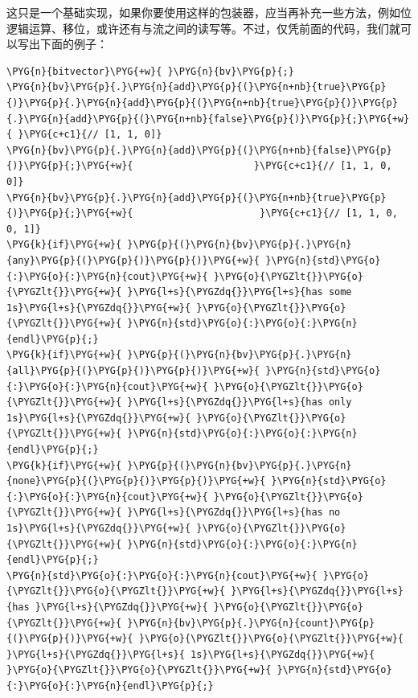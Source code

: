 
这只是一个基础实现，如果你要使用这样的包装器，应当再补充一些方法，例如位逻辑运算、移位，或许还有与流之间的读写等。不过，仅凭前面的代码，我们就可以写出下面的例子：



\begin{codeblockbg}
\begin{Verbatim}[commandchars=\\\{\},breaklines=true,breakanywhere=true,fontsize=\codefont,xleftmargin=17bp]
\PYG{n}{bitvector}\PYG{+w}{ }\PYG{n}{bv}\PYG{p}{;}
\PYG{n}{bv}\PYG{p}{.}\PYG{n}{add}\PYG{p}{(}\PYG{n+nb}{true}\PYG{p}{)}\PYG{p}{.}\PYG{n}{add}\PYG{p}{(}\PYG{n+nb}{true}\PYG{p}{)}\PYG{p}{.}\PYG{n}{add}\PYG{p}{(}\PYG{n+nb}{false}\PYG{p}{)}\PYG{p}{;}\PYG{+w}{ }\PYG{c+c1}{// [1, 1, 0]}
\PYG{n}{bv}\PYG{p}{.}\PYG{n}{add}\PYG{p}{(}\PYG{n+nb}{false}\PYG{p}{)}\PYG{p}{;}\PYG{+w}{                     }\PYG{c+c1}{// [1, 1, 0, 0]}
\PYG{n}{bv}\PYG{p}{.}\PYG{n}{add}\PYG{p}{(}\PYG{n+nb}{true}\PYG{p}{)}\PYG{p}{;}\PYG{+w}{                      }\PYG{c+c1}{// [1, 1, 0, 0, 1]}
\PYG{k}{if}\PYG{+w}{ }\PYG{p}{(}\PYG{n}{bv}\PYG{p}{.}\PYG{n}{any}\PYG{p}{(}\PYG{p}{)}\PYG{p}{)}\PYG{+w}{ }\PYG{n}{std}\PYG{o}{:}\PYG{o}{:}\PYG{n}{cout}\PYG{+w}{ }\PYG{o}{\PYGZlt{}}\PYG{o}{\PYGZlt{}}\PYG{+w}{ }\PYG{l+s}{\PYGZdq{}}\PYG{l+s}{has some 1s}\PYG{l+s}{\PYGZdq{}}\PYG{+w}{ }\PYG{o}{\PYGZlt{}}\PYG{o}{\PYGZlt{}}\PYG{+w}{ }\PYG{n}{std}\PYG{o}{:}\PYG{o}{:}\PYG{n}{endl}\PYG{p}{;}
\PYG{k}{if}\PYG{+w}{ }\PYG{p}{(}\PYG{n}{bv}\PYG{p}{.}\PYG{n}{all}\PYG{p}{(}\PYG{p}{)}\PYG{p}{)}\PYG{+w}{ }\PYG{n}{std}\PYG{o}{:}\PYG{o}{:}\PYG{n}{cout}\PYG{+w}{ }\PYG{o}{\PYGZlt{}}\PYG{o}{\PYGZlt{}}\PYG{+w}{ }\PYG{l+s}{\PYGZdq{}}\PYG{l+s}{has only 1s}\PYG{l+s}{\PYGZdq{}}\PYG{+w}{ }\PYG{o}{\PYGZlt{}}\PYG{o}{\PYGZlt{}}\PYG{+w}{ }\PYG{n}{std}\PYG{o}{:}\PYG{o}{:}\PYG{n}{endl}\PYG{p}{;}
\PYG{k}{if}\PYG{+w}{ }\PYG{p}{(}\PYG{n}{bv}\PYG{p}{.}\PYG{n}{none}\PYG{p}{(}\PYG{p}{)}\PYG{p}{)}\PYG{+w}{ }\PYG{n}{std}\PYG{o}{:}\PYG{o}{:}\PYG{n}{cout}\PYG{+w}{ }\PYG{o}{\PYGZlt{}}\PYG{o}{\PYGZlt{}}\PYG{+w}{ }\PYG{l+s}{\PYGZdq{}}\PYG{l+s}{has no 1s}\PYG{l+s}{\PYGZdq{}}\PYG{+w}{ }\PYG{o}{\PYGZlt{}}\PYG{o}{\PYGZlt{}}\PYG{+w}{ }\PYG{n}{std}\PYG{o}{:}\PYG{o}{:}\PYG{n}{endl}\PYG{p}{;}
\PYG{n}{std}\PYG{o}{:}\PYG{o}{:}\PYG{n}{cout}\PYG{+w}{ }\PYG{o}{\PYGZlt{}}\PYG{o}{\PYGZlt{}}\PYG{+w}{ }\PYG{l+s}{\PYGZdq{}}\PYG{l+s}{has }\PYG{l+s}{\PYGZdq{}}\PYG{+w}{ }\PYG{o}{\PYGZlt{}}\PYG{o}{\PYGZlt{}}\PYG{+w}{ }\PYG{n}{bv}\PYG{p}{.}\PYG{n}{count}\PYG{p}{(}\PYG{p}{)}\PYG{+w}{ }\PYG{o}{\PYGZlt{}}\PYG{o}{\PYGZlt{}}\PYG{+w}{ }\PYG{l+s}{\PYGZdq{}}\PYG{l+s}{ 1s}\PYG{l+s}{\PYGZdq{}}\PYG{+w}{ }\PYG{o}{\PYGZlt{}}\PYG{o}{\PYGZlt{}}\PYG{+w}{ }\PYG{n}{std}\PYG{o}{:}\PYG{o}{:}\PYG{n}{endl}\PYG{p}{;}

\end{Verbatim}
\end{codeblockbg}
